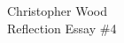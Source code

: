 \documentclass[12pt,letterpaper]{article}
\begin{document}
\begin{center}
Christopher Wood \\
Reflection Essay \#4 \\
\end{center}

\begin{comment}
What are the most compelling arguments for the goto statement?

What are the most compelling arguments against the goto statement?

These papers were written approximately 40 years ago. Are there new arguments for or against the goto statement that are relevant 
today?

Can you give a feature or application of a programming language that you consider harmful? Be sure to back up your claim with a reasoned argument.
\end{comment}


\end{document}
